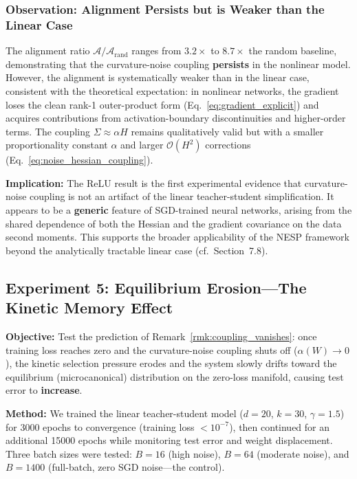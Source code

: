 \documentclass[
  journal=largetwo,
  simfonts=false,
  year=2025,
  volume=37,
]{cup-journal}
\begin{document}
\subsubsection{Observation: Alignment Persists but is Weaker than the Linear Case}

The alignment ratio $\mathcal{A} / \mathcal{A}_{\mathrm{rand}}$ ranges from $3.2\times$ to $8.7\times$ the random baseline, demonstrating that the curvature-noise coupling \textbf{persists} in the nonlinear model. However, the alignment is systematically weaker than in the linear case, consistent with the theoretical expectation: in nonlinear networks, the gradient loses the clean rank-1 outer-product form (Eq.~\ref{eq:gradient_explicit}) and acquires contributions from activation-boundary discontinuities and higher-order terms. The coupling $\Sigma \approx \alpha H$ remains qualitatively valid but with a smaller proportionality constant $\alpha$ and larger $\mathcal{O}(H^2)$ corrections (Eq.~\ref{eq:noise_hessian_coupling}).

\textbf{Implication:} The ReLU result is the first experimental evidence that curvature-noise coupling is not an artifact of the linear teacher-student simplification. It appears to be a \textbf{generic} feature of SGD-trained neural networks, arising from the shared dependence of both the Hessian and the gradient covariance on the data second moments. This supports the broader applicability of the NESP framework beyond the analytically tractable linear case (cf.\ Section~7.8).

\subsection{Experiment 5: Equilibrium Erosion---The Kinetic Memory Effect}

\textbf{Objective:} Test the prediction of Remark~\ref{rmk:coupling_vanishes}: once training loss reaches zero and the curvature-noise coupling shuts off ($\alpha(W) \to 0$), the kinetic selection pressure erodes and the system slowly drifts toward the equilibrium (microcanonical) distribution on the zero-loss manifold, causing test error to \textbf{increase}.

\textbf{Method:} We trained the linear teacher-student model ($d=20$, $k=30$, $\gamma = 1.5$) for 3000 epochs to convergence (training loss $< 10^{-7}$), then continued for an additional 15000 epochs while monitoring test error and weight displacement. Three batch sizes were tested: $B=16$ (high noise), $B=64$ (moderate noise), and $B=1400$ (full-batch, zero SGD noise---the control).
\end{document}
